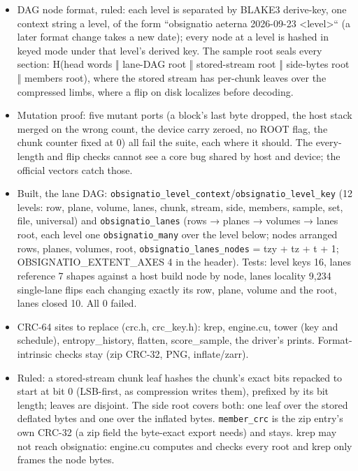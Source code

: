 \begin{itemize}
\item DAG node format, ruled: each level is separated by BLAKE3 derive-key, one context string a level, of the form “obsignatio aeterna 2026-09-23 <level>“ (a later format change takes a new date); every node at a level is hashed in keyed mode under that level's derived key. The sample root seals every section: H(head words ‖ lane-DAG root ‖ stored-stream root ‖ side-bytes root ‖ members root), where the stored stream has per-chunk leaves over the compressed limbs, where a flip on disk localizes before decoding.
\item Mutation proof: five mutant ports (a block's last byte dropped, the host stack merged on the wrong count, the device carry zeroed, no ROOT flag, the chunk counter fixed at 0) all fail the suite, each where it should. The every-length and flip checks cannot see a core bug shared by host and device; the official vectors catch those.
\item Built, the lane DAG: \texttt{obsignatio\_\allowbreak{}level\_\allowbreak{}context}/\texttt{obsignatio\_\allowbreak{}level\_\allowbreak{}key} (12 levels: row, plane, volume, lanes, chunk, stream, side, members, sample, set, file, universal) and \texttt{obsignatio\_\allowbreak{}lanes} (rows → planes → volumes → lanes root, each level one \texttt{obsignatio\_\allowbreak{}many} over the level below; nodes arranged rows, planes, volumes, root, \texttt{obsignatio\_\allowbreak{}lanes\_\allowbreak{}nodes} = tzy + tz + t + 1; OBSIGNATIO\_\allowbreak{}EXTENT\_\allowbreak{}AXES 4 in the header). Tests: level keys 16, lanes reference 7 shapes against a host build node by node, lanes locality 9,234 single-lane flips each changing exactly its row, plane, volume and the root, lanes closed 10. All 0 failed.
\item CRC-64 sites to replace (crc.h, crc\_\allowbreak{}key.h): krep, engine.cu, tower (key and schedule), entropy\_\allowbreak{}history, flatten, score\_\allowbreak{}sample, the driver's prints. Format-intrinsic checks stay (zip CRC-32, PNG, inflate/zarr).
\item Ruled: a stored-stream chunk leaf hashes the chunk's exact bits repacked to start at bit 0 (LSB-first, as compression writes them), prefixed by its bit length; leaves are disjoint. The side root covers both: one leaf over the stored deflated bytes and one over the inflated bytes. \texttt{member\_\allowbreak{}crc} is the zip entry's own CRC-32 (a zip field the byte-exact export needs) and stays. krep may not reach obsignatio: engine.cu computes and checks every root and krep only frames the node bytes.

\end{itemize}
